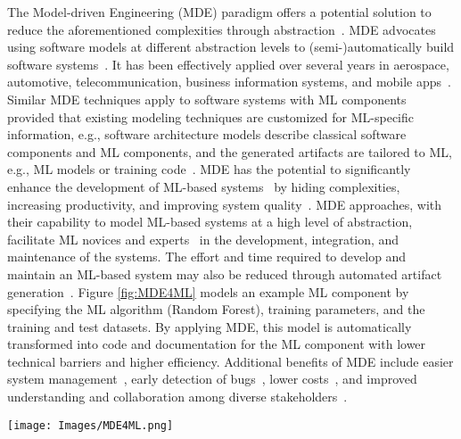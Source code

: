 The Model-driven Engineering (MDE) paradigm offers a potential solution to reduce the aforementioned complexities through abstraction~\cite{hutchinson2011model,moin2022model}. MDE advocates using software models at different abstraction levels to (semi-)automatically build software systems~\cite{brambilla2017model, moin2022model}. It has been effectively applied over several years in aerospace, automotive, telecommunication, business information systems, and mobile apps~\cite{mussbacher2014relevance, hutchinson2011model, hutchinson2011empirical, shamsujjoha2021developing}. Similar MDE techniques apply to software systems with ML components provided that existing modeling techniques are customized for ML-specific information, e.g., software architecture models describe classical software components and ML components, and the generated artifacts are tailored to ML, e.g., ML models or training code~\cite{moin2022model}. MDE has the potential to significantly enhance the development of ML-based systems~\cite{bucchiarone2020grand} by hiding complexities, increasing productivity, and improving system quality~\cite{moin2022model, mohagheghi2008proof}. MDE approaches, with their capability to model ML-based systems at a high level of abstraction, facilitate ML novices and experts~\cite{bucchiarone2020grand} in the development, integration, and maintenance of the systems. The effort and time required to develop and maintain an ML-based system may also be reduced through automated artifact generation~\cite{volter2013model}. 
%
Figure \ref{fig:MDE4ML} models an example ML component by specifying the ML algorithm (Random Forest), training parameters, and the training and test datasets. By applying MDE, this model is automatically transformed into code and documentation for the ML component with lower technical barriers and higher efficiency. Additional benefits of MDE include easier system management~\cite{bhattacharjee2019stratum}, early detection of bugs~\cite{mohagheghi2008proof}, lower costs~\cite{fleurey2007model, mohagheghi2013empirical}, and improved understanding and collaboration among diverse stakeholders~\cite{khalajzadeh2020end}.

\begin{figure*}[htbp]
    \centering
    \texttt{[image: Images/MDE4ML.png]}
    \caption{Model-driven Engineering for Machine Learning}
    \label{fig:MDE4ML}
\end{figure*}

